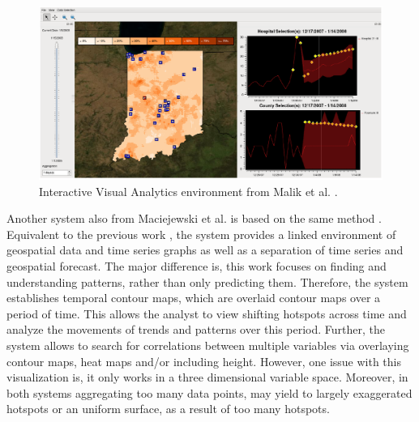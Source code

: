 \documentclass[electronic]{vgtc}             %
\begin{document}
\begin{figure}[tb]
	\centering
	\includegraphics[width=\columnwidth]{Hotspot}
	\caption{Interactive Visual Analytics environment from Malik et al. \cite{maciejewski:2011}. 
	}
	\label{fig:hotspot}
\end{figure}

Another system also from Maciejewski et al. \cite{maciejewski:2010} is based on the same method .
Equivalent to the previous work \cite{maciejewski:2011}, the system provides a linked environment of geospatial data and time series graphs as well as a separation of time series and geospatial forecast.
The major difference is, this work focuses on finding and understanding patterns, rather than only predicting them.
Therefore, the system establishes temporal contour maps, which are overlaid contour maps over a period of time. 
This allows the analyst to view shifting hotspots across time and analyze the movements of trends and patterns over this period.
Further, the system allows to search for correlations between multiple variables via overlaying contour maps, heat maps and/or including height. 
However, one issue with this visualization is, it only works in a three dimensional variable space.
Moreover, in both systems aggregating too many data points, may yield to largely exaggerated hotspots or an uniform surface, as a result of too many hotspots. 
\end{document}
